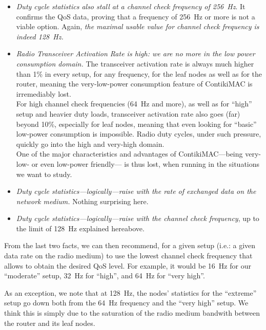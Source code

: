 \documentclass[a4paper,twoside]{article}
\begin{document}
\begin{itemize}

\item \emph{Duty cycle statistics also stall at a channel check frequency
of 256~Hz}. It confirms the QoS data, proving that a frequency of 256~Hz
or more is not a viable option. Again, \emph{the maximal usable value
for channel check frequency is indeed 128~Hz.}

\item \emph{Radio Transceiver Activation Rate is high: we are no more
in the low power consumption domain.} The transceiver activation rate
is always much higher than 1\% in every setup, for any frequency, for
the leaf nodes as well as for the router, meaning the very-low-power
consumption feature of ContikiMAC is irremediably lost.\\
For high channel check frequencies (64~Hz and more), as well as for
``high'' setup and heavier duty loads, transceiver activation rate
also goes (far) beyond 10\%, especially for leaf nodes, meaning that
even looking for ``basic'' low-power consumption is impossible.
Radio duty cycles, under such pressure, quickly go into the high
and very-high domain.\\
One of the major characteristics and advantages of ContikiMAC---being
very-low- or even low-power friendly--- is thus lost, when running
in the situations we want to study.

\item \emph{Duty cycle statistics---logically---raise with the rate of
exchanged data on the network medium.} Nothing surprising here.

\item \emph{Duty cycle statistics---logically---raise with the channel check
frequency}, up to the limit of 128~Hz explained hereabove.

\end{itemize}

From the last two facts, we can then recommend, for a given setup
(i.e.: a given data rate on the radio medium) to use the lowest channel
check frequency that allows to obtain the desired QoS level.
For example, it would be 16~Hz for our ``moderate'' setup, 32~Hz for
``high'', and 64~Hz for ``very high''.

As an exception, we note that at 128~Hz, the nodes' statistics for the
``extreme'' setup go down both from the 64~Hz frequency and the ``very high''
setup. We think this is simply due to the saturation of the radio medium
bandwith between the router and its leaf nodes.
\end{document}
